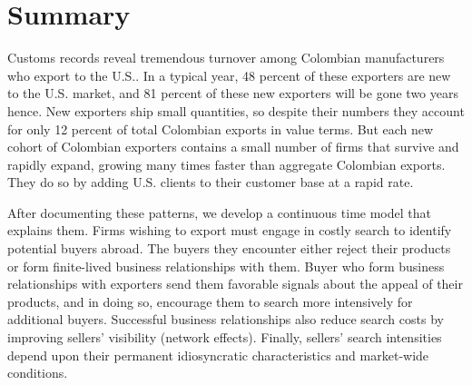\documentclass[12pt,titlepage]{article}
\begin{document}
\pagebreak %
%
% 
% 
% 


\section{Summary}

Customs records reveal tremendous turnover among Colombian manufacturers who
export to the U.S.. In a typical year, 48 percent of these exporters are new
to the U.S. market, and 81 percent of these new exporters will be gone two
years hence. New exporters ship small quantities, so despite their numbers
they account for only 12 percent of total Colombian exports in value terms.
But each new cohort of Colombian exporters contains a small
number of firms that survive and rapidly expand, growing many times faster
than aggregate Colombian exports. They do so by adding U.S. clients to their
customer base at a rapid rate.

After documenting these patterns, we develop a continuous time model that
explains them. Firms wishing to export must engage in costly search to
identify potential buyers abroad. The buyers they encounter either reject
their products or form finite-lived business relationships with them. Buyer
who form business relationships with exporters send them favorable signals
about the appeal of their products, and in doing so, encourage them to
search more intensively for additional buyers. Successful business
relationships also reduce search costs by improving sellers' visibility
(network effects). Finally, sellers' search intensities depend upon their
permanent idiosyncratic characteristics and market-wide conditions.
\end{document}
